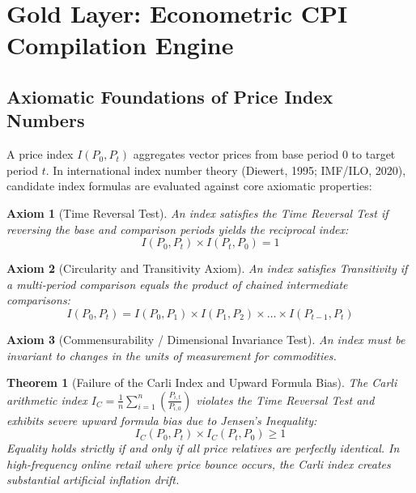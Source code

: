\documentclass[11pt,a4paper]{article}
\newtheorem{theorem}{Theorem}
\newtheorem{axiom}{Axiom}
\begin{document}
\newpage

\section{Gold Layer: Econometric CPI Compilation Engine}

\subsection{Axiomatic Foundations of Price Index Numbers}
A price index $I(P_0, P_t)$ aggregates vector prices from base period $0$ to target period $t$. In international index number theory (Diewert, 1995; IMF/ILO, 2020), candidate index formulas are evaluated against core axiomatic properties:

\begin{axiom}[Time Reversal Test]
An index satisfies the Time Reversal Test if reversing the base and comparison periods yields the reciprocal index:
\begin{equation}
I(P_0, P_t) \times I(P_t, P_0) = 1
\end{equation}
\end{axiom}

\begin{axiom}[Circularity and Transitivity Axiom]
An index satisfies Transitivity if a multi-period comparison equals the product of chained intermediate comparisons:
\begin{equation}
I(P_0, P_t) = I(P_0, P_1) \times I(P_1, P_2) \times \dots \times I(P_{t-1}, P_t)
\end{equation}
\end{axiom}

\begin{axiom}[Commensurability / Dimensional Invariance Test]
An index must be invariant to changes in the units of measurement for commodities.
\end{axiom}

\begin{theorem}[Failure of the Carli Index and Upward Formula Bias]
The Carli arithmetic index $I_C = \frac{1}{n} \sum_{i=1}^n \left( \frac{P_{i,t}}{P_{i,0}} \right)$ violates the Time Reversal Test and exhibits severe upward formula bias due to Jensen's Inequality:
\begin{equation}
I_C(P_0, P_t) \times I_C(P_t, P_0) \ge 1
\end{equation}
Equality holds strictly if and only if all price relatives are perfectly identical. In high-frequency online retail where price bounce occurs, the Carli index creates substantial artificial inflation drift.
\end{theorem}
\end{document}
